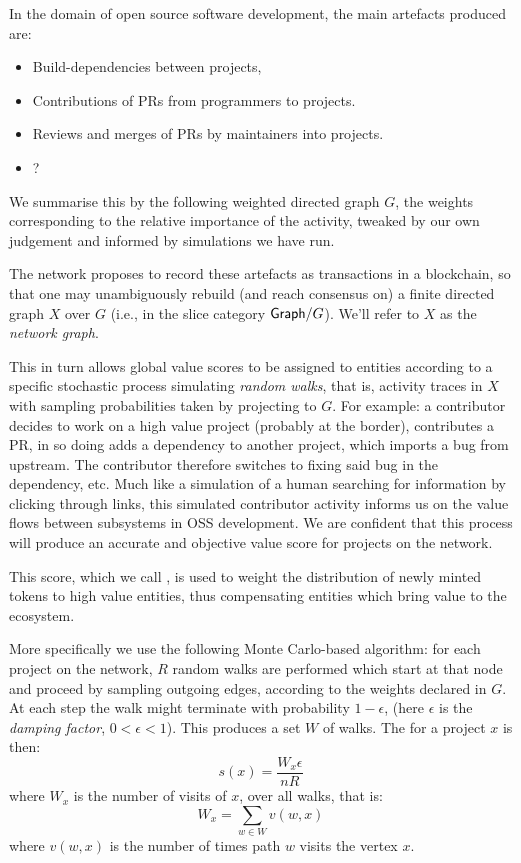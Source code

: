 In the domain of open source software development, the main artefacts
produced are:
\begin{itemize}
  \item Build-dependencies between projects,
  \item Contributions of PRs from programmers to projects.
  \item Reviews and merges of PRs by maintainers into projects.
  \item ? %
\end{itemize}

We summarise this by the following weighted directed graph $G$, the
weights corresponding to the relative importance of the activity,
tweaked by our own judgement and informed by simulations we have run.



The \oscoin{} network proposes to record these artefacts as
transactions in a blockchain, so that one may unambiguously rebuild
(and reach consensus on) a finite directed graph $X$ over $G$ (i.e.,
in the slice category $\mathsf{Graph}/G$). We'll refer to $X$ as the
\emph{network graph}.

This in turn allows global value scores to be assigned to entities
according to a specific stochastic process simulating \emph{random
  walks}, that is, activity traces in $X$ with sampling probabilities
taken by projecting to $G$. For example: a contributor decides to work
on a high value project (probably at the border), contributes a PR, in
so doing adds a dependency to another project, which imports a bug
from upstream. The contributor therefore switches to fixing said bug
in the dependency, etc. Much like a simulation of a human searching
for information by clicking through links, this simulated contributor
activity informs us on the value flows between subsystems in OSS
development. We are confident that this process will produce an
accurate and objective value score for projects on the
network. %

This score, which we call \osrank{}, is used to weight the
distribution of newly minted tokens to high value entities, thus
compensating entities which bring value to the ecosystem.

More specifically we use the following Monte Carlo-based algorithm:
for each project on the network, $R$ random walks are performed which
start at that node and proceed by sampling outgoing edges, according
to the weights declared in $G$. At each step the walk might terminate
with probability $1 - \epsilon$, (here $\epsilon$ is the \emph{damping
  factor}, $0 < \epsilon < 1$). This produces a set $W$ of walks. The
\osrank{} for a project $x$ is then:
\[
  s(x) = \frac{W_x \epsilon}{n R}
\]
where $W_x$ is the number of visits of $x$, over all walks, that is:
\[
W_x = \sum_{w \in W} v(w,x)
\]
where $v(w,x)$ is the number of times path $w$ visits the vertex $x$.

